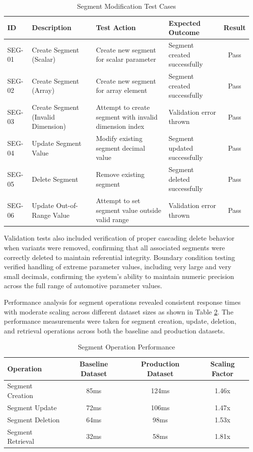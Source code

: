 \begin{table}[h]
\centering
\caption{Segment Modification Test Cases}
\label{tab:segment-test-cases}
\begin{tabular}{|p{0.7cm}|p{3.5cm}|p{3.5cm}|p{3.5cm}|c|}
\hline
\textbf{ID} & \textbf{Description} & \textbf{Test Action} & \textbf{Expected Outcome} & \textbf{Result} \\
\hline
SEG-01 & Create Segment (Scalar) & Create new segment for scalar parameter & Segment created successfully & Pass \\
\hline
SEG-02 & Create Segment (Array) & Create new segment for array element & Segment created successfully & Pass \\
\hline
SEG-03 & Create Segment (Invalid Dimension) & Attempt to create segment with invalid dimension index & Validation error thrown & Pass \\
\hline
SEG-04 & Update Segment Value & Modify existing segment decimal value & Segment updated successfully & Pass \\
\hline
SEG-05 & Delete Segment & Remove existing segment & Segment deleted successfully & Pass \\
\hline
SEG-06 & Update Out-of-Range Value & Attempt to set segment value outside valid range & Validation error thrown & Pass \\
\hline
\end{tabular}
\end{table}

Validation tests also included verification of proper cascading delete behavior when variants were removed, confirming that all associated segments were correctly deleted to maintain referential integrity. Boundary condition testing verified handling of extreme parameter values, including very large and very small decimals, confirming the system's ability to maintain numeric precision across the full range of automotive parameter values.

Performance analysis for segment operations revealed consistent response times with moderate scaling across different dataset sizes as shown in Table \ref{tab:segment-performance}. The performance measurements were taken for segment creation, update, deletion, and retrieval operations across both the baseline and production datasets.

\begin{table}[h]
\centering
\caption{Segment Operation Performance}
\label{tab:segment-performance}
\begin{tabular}{|l|c|c|c|}
\hline
\textbf{Operation} & \textbf{Baseline Dataset} & \textbf{Production Dataset} & \textbf{Scaling Factor} \\
\hline
Segment Creation & 85ms & 124ms & 1.46x \\
\hline
Segment Update & 72ms & 106ms & 1.47x \\
\hline
Segment Deletion & 64ms & 98ms & 1.53x \\
\hline
Segment Retrieval & 32ms & 58ms & 1.81x \\
\hline
\end{tabular}
\end{table}

